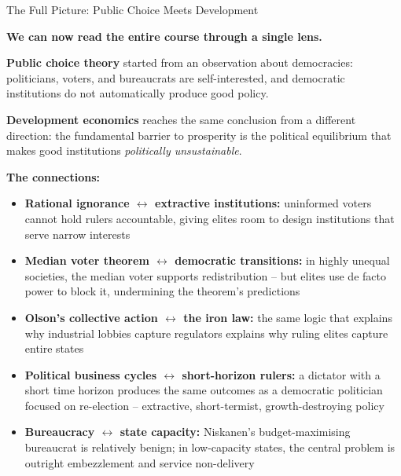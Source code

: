 \documentclass[10pt]{beamer}
\begin{document}
\begin{frame}[allowframebreaks]{The Full Picture: Public Choice Meets Development}

\textbf{We can now read the entire course through a single lens.}


\textbf{Public choice theory} started from an observation about democracies: politicians, voters, and bureaucrats are self-interested, and democratic institutions do not automatically produce good policy.


\textbf{Development economics} reaches the same conclusion from a different direction: the fundamental barrier to prosperity is the political equilibrium that makes good institutions \emph{politically unsustainable}.


\textbf{The connections:}

\begin{itemize}
\item \textbf{Rational ignorance $\leftrightarrow$ extractive institutions:} uninformed voters cannot hold rulers accountable, giving elites room to design institutions that serve narrow interests
\item \textbf{Median voter theorem $\leftrightarrow$ democratic transitions:} in highly unequal societies, the median voter supports redistribution -- but elites use de facto power to block it, undermining the theorem's predictions
\item \textbf{Olson's collective action $\leftrightarrow$ the iron law:} the same logic that explains why industrial lobbies capture regulators explains why ruling elites capture entire states
\item \textbf{Political business cycles $\leftrightarrow$ short-horizon rulers:} a dictator with a short time horizon produces the same outcomes as a democratic politician focused on re-election -- extractive, short-termist, growth-destroying policy
\item \textbf{Bureaucracy $\leftrightarrow$ state capacity:} Niskanen's budget-maximising bureaucrat is relatively benign; in low-capacity states, the central problem is outright embezzlement and service non-delivery
\end{itemize}
\end{frame}
\end{document}
